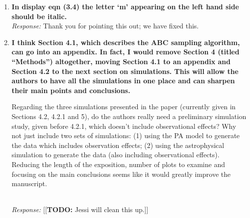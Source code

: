 \documentclass[11pt, oneside]{article}   	%
\newcommand{\jessi}[1]{{\color{blue}[[\textbf{Jessi: }#1]]}}
\newcommand{\todo}[1]{{\color{red}[[\textbf{TODO: }#1]]}}
\begin{document}
\begin{enumerate}
{This statement confuses me a bit. It seems to suggest that we only observe the initial formation of star clusters. I would expect the opposite, i.e. that the star clusters we observe are a mix of old and new clusters that have developed over different time ranges. Perhaps the authors are getting at a selection effect where the old star clusters are more dim and are effectively censored due to the sensitivity of our instruments. Either way, this paragraph could use some cleaning up.} \\
\noindent \emph{Response:} \jessi{I can respond}
\bigskip

\item {\bf In display eqn (3.4) the letter `m' appearing on the left hand side should be italic.} \\
\noindent \emph{Response:} Thank you for pointing this out; we have fixed this.
\bigskip

\item {\bf I think Section 4.1, which describes the ABC sampling algorithm, can go into an appendix. In fact, I would remove Section 4 (titled ``Methods'') altogether, moving Section 4.1 to an appendix and Section 4.2 to the next section on simulations. This will allow the authors to have all the simulations in one place and can sharpen their main points and conclusions.

Regarding the three simulations presented in the paper (currently given in Sections 4.2, 4.2.1 and 5), do the authors really need a preliminary simulation study, given before 4.2.1, which doesn't include observational effects? Why not just include two sets of simulations: (1) using the PA model to generate the data which includes observation effects; (2) using the astrophysical simulation to generate the data (also including observational effects). Reducing the length of the exposition, number of plots to examine and focusing on the main conclusions seems like it would greatly improve the manuscript.
}\\
\noindent \emph{Response:} \todo{Jessi will clean this up.}
\bigskip
\end{enumerate}
\end{document}
